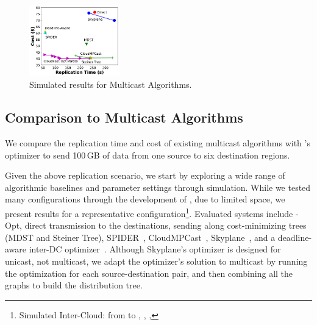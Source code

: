 



\begin{figure}[t]
    \centering
    \includegraphics[width=
    0.35\textwidth]{figures/pareto.pdf}
    \caption{Simulated results for Multicast Algorithms.} 
    \label{fig:simulated-baselines}
\end{figure}




\subsection{Comparison to Multicast Algorithms}
\label{sec:algorithm_eval}

We compare the replication time and cost of existing multicast algorithms with \sys's optimizer to send 100\,GB of data from one source to six destination regions.

Given the above replication scenario, we start by exploring a wide range of algorithmic baselines and \sys parameter settings through simulation.
While we tested many configurations through the development of \sys, due to limited space, we present results for a representative configuration\footnote{Simulated Inter-Cloud: from  to , , , }.
Evaluated systems include \sys-Opt, direct transmission to the destinations, sending along cost-minimizing trees (MDST and Steiner Tree),  SPIDER~\cite{ganguly2005fast}, CloudMPCast~\cite{garcia2015cost}, Skyplane~\cite{jain2022skyplane}, and a deadline-aware inter-DC optimizer~\cite{deadline2018}.
Although Skyplane's optimizer is designed for unicast, not multicast, we adapt the optimizer's solution to multicast by running the optimization for each source-destination pair, and then combining all the graphs to build the distribution tree. 

